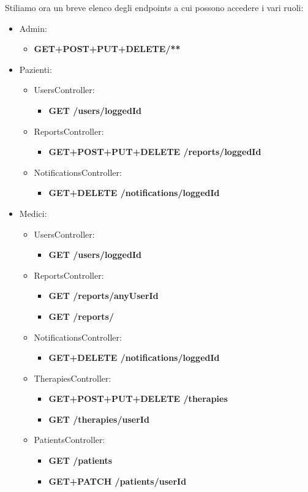 \documentclass[a4paper]{article}
\begin{document}
Stiliamo ora un breve elenco degli endpoints a cui possono accedere i vari ruoli:
\begin{itemize}
  \item Admin:
  \begin{itemize}
    \item \textbf{GET+POST+PUT+DELETE/**}
  \end{itemize}
  \item Pazienti:
  \begin{itemize}
    \item UsersController: 
    \begin{itemize}
      \item \textbf{GET /users/{loggedId}}
    \end{itemize}
    \item ReportsController: \begin{itemize}
      \item \textbf{GET+POST+PUT+DELETE /reports/{loggedId}}
    \end{itemize}
    \item NotificationsController: 
    \begin{itemize}
      \item \textbf{GET+DELETE /notifications/{loggedId}}
    \end{itemize}
  \end{itemize}
  \item Medici:
  \begin{itemize}
    \item UsersController:
    \begin{itemize}
      \item \textbf{GET /users/{loggedId}} 
    \end{itemize}
    \item ReportsController:
    \begin{itemize}
      \item \textbf{GET /reports/{anyUserId}}
      \item \textbf{GET /reports/}
    \end{itemize}
    \item NotificationsController:
    \begin{itemize}
      \item \textbf{GET+DELETE /notifications/{loggedId}}
    \end{itemize}
    \item TherapiesController:
    \begin{itemize}
      \item \textbf{GET+POST+PUT+DELETE /therapies}
      \item \textbf{GET /therapies/{userId}}
    \end{itemize}
    \item PatientsController:
    \begin{itemize}
      \item \textbf{GET /patients}
      \item \textbf{GET+PATCH /patients/{userId}}
    \end{itemize}
  \end{itemize}
\end{itemize}
\end{document}
